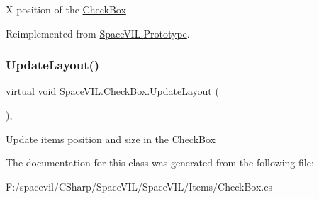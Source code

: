 X position of the \mbox{\hyperlink{class_space_v_i_l_1_1_check_box}{Check\+Box}} 



Reimplemented from \mbox{\hyperlink{class_space_v_i_l_1_1_prototype}{Space\+V\+I\+L.\+Prototype}}.

\mbox{\label{class_space_v_i_l_1_1_check_box_a03402e85defa2b269c933b9000d70835}} 
\subsubsection{\texorpdfstring{Update\+Layout()}{UpdateLayout()}}
{\footnotesize\ttfamily virtual void Space\+V\+I\+L.\+Check\+Box.\+Update\+Layout (\begin{DoxyParamCaption}{ }\end{DoxyParamCaption})\hspace{0.3cm}{\ttfamily [inline]}, {\ttfamily [virtual]}}



Update items position and size in the \mbox{\hyperlink{class_space_v_i_l_1_1_check_box}{Check\+Box}} 



The documentation for this class was generated from the following file\+:\begin{DoxyCompactItemize}
\item 
F\+:/spacevil/\+C\+Sharp/\+Space\+V\+I\+L/\+Space\+V\+I\+L/\+Items/Check\+Box.\+cs\end{DoxyCompactItemize}

